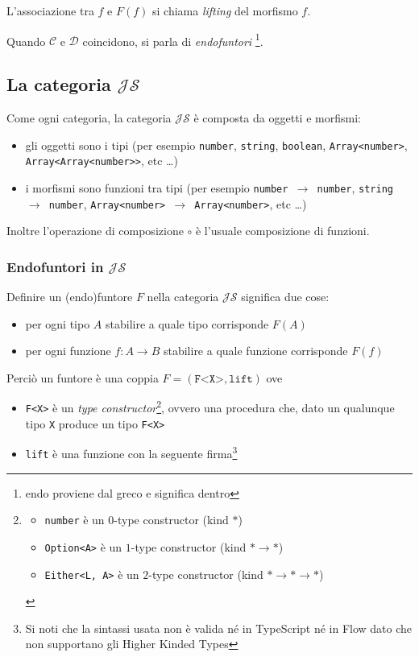 \documentclass[12pt]{article}
\begin{document}
L'associazione tra $f$ e $F(f)$ si chiama \emph{lifting} del morfismo $f$.

Quando $\mathcal{C}$ e $\mathcal{D}$ coincidono, si parla di \emph{endofuntori} \footnote{endo proviene dal greco e significa dentro}.

\subsection{La categoria $\mathcal{JS}$}

Come ogni categoria, la categoria $\mathcal{JS}$ è composta da oggetti e morfismi:

\begin{itemize}
  \item gli oggetti sono i tipi (per esempio \texttt{number}, \texttt{string}, \texttt{boolean}, \texttt{Array<number>}, \texttt{Array<Array<number>>}, etc \ldots)
  \item i morfismi sono funzioni tra tipi (per esempio \texttt{number $\rightarrow$ number}, \texttt{string $\rightarrow$ number}, \texttt{Array<number> $\rightarrow$ Array<number>}, etc \ldots)
\end{itemize}

Inoltre l'operazione di composizione $\circ$ è l'usuale composizione di funzioni.

\subsubsection{Endofuntori in $\mathcal{JS}$}

Definire un (endo)funtore $F$ nella categoria $\mathcal{JS}$ significa due cose:

\begin{itemize}
  \item per ogni tipo $A$ stabilire a quale tipo corrisponde $F(A)$
  \item per ogni funzione $f: A \rightarrow B$ stabilire a quale funzione corrisponde $F(f)$
\end{itemize}

Perciò un funtore è una coppia $F = (\texttt{F<X>}, \texttt{lift})$ ove

\begin{itemize}
  \item \texttt{F<X>} è un \emph{type constructor}\footnote{
    \begin{itemize}
      \item \texttt{number} è un $0$-type constructor (kind $*$)
      \item \texttt{Option<A>} è un $1$-type constructor (kind $* \rightarrow *$)
      \item \texttt{Either<L, A>} è un $2$-type constructor (kind $* \rightarrow * \rightarrow *$)
    \end{itemize}
  }, ovvero una procedura che, dato un qualunque tipo \texttt{X} produce un tipo \texttt{F<X>}
  \item \texttt{lift} è una funzione con la seguente firma\footnote{Si noti che la sintassi usata non è valida né in TypeScript né in Flow dato che non supportano gli Higher Kinded Types}
\end{itemize}
\end{document}
